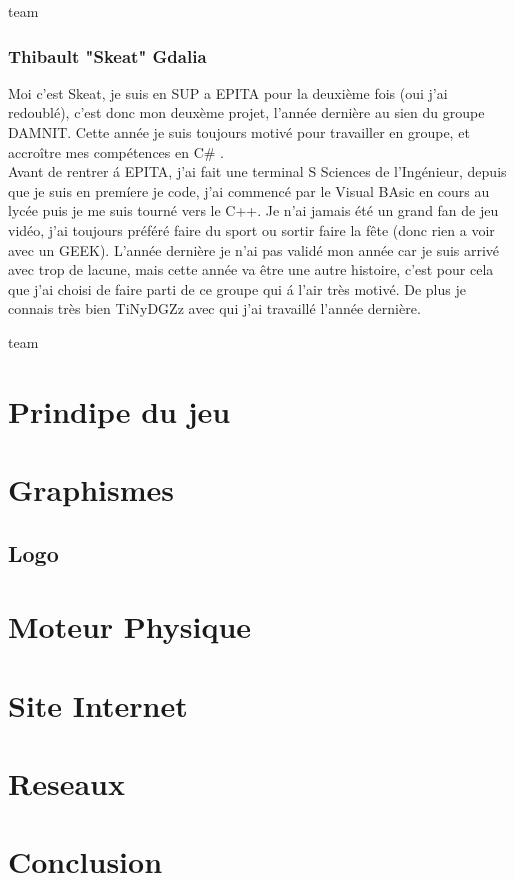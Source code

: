 \documentclass [11pt]{report}
\begin{document}
		\vfill
		team
		\newpage
		\subsection {Thibault "Skeat" Gdalia}
			Moi c'est Skeat, je suis en SUP a EPITA pour la deuxi\`eme fois (oui j'ai redoubl\'e),  c'est donc mon deux\`eme projet, l'ann\'ee derni\`ere au sien du groupe DAMNIT. Cette ann\'ee je suis toujours motiv\'e pour travailler en groupe, et accro\^itre mes comp\'etences en C\# . 
			\\  Avant de rentrer \'a EPITA, j'ai fait une terminal S Sciences de l'Ing\'enieur, depuis que je suis en prem\'iere je code, j'ai commenc\'e par le Visual BAsic en cours au lyc\'ee puis je me suis tourn\'e vers le C++. Je n'ai jamais \'et\'e un grand fan de jeu vid\'eo, j'ai toujours pr\'ef\'er\'e faire du sport ou sortir faire la f\^ete (donc rien a voir avec un GEEK). L'ann\'ee derni\`ere je n'ai pas valid\'e mon ann\'ee car je suis arriv\'e avec trop de lacune, mais cette ann\'ee va \^etre une autre histoire, c'est pour cela que j'ai choisi de faire parti de ce groupe qui \'a l'air tr\`es motiv\'e. De plus je connais tr\`es bien TiNyDGZz avec qui j'ai travaill\'e l'ann\'ee derni\`ere.
	
	\vfill
	team
	\newpage\
\chapter{Prindipe du jeu}

\chapter {Graphismes}
	\section {Logo}
\chapter {Moteur Physique}
\chapter {Site Internet}
\chapter {Reseaux}
\chapter {Conclusion}
\end{document}
